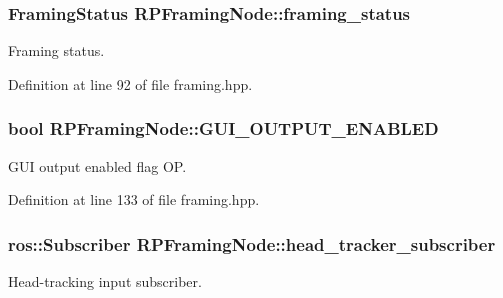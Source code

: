 \hypertarget{class_r_p_framing_node_adcfd6823bc9579a1deb6ca6640f44b93}{
\subsubsection[{framing\-\_\-status}]{\setlength{\rightskip}{0pt plus 5cm}\-Framing\-Status {\bf \-R\-P\-Framing\-Node\-::framing\-\_\-status}}}\label{class_r_p_framing_node_adcfd6823bc9579a1deb6ca6640f44b93}
\-Framing status. 

\-Definition at line 92 of file framing.\-hpp.

\hypertarget{class_r_p_framing_node_a8c5a4411117ae10fe4ff69c0fa3fb465}{
\subsubsection[{\-G\-U\-I\-\_\-\-O\-U\-T\-P\-U\-T\-\_\-\-E\-N\-A\-B\-L\-E\-D}]{\setlength{\rightskip}{0pt plus 5cm}bool {\bf \-R\-P\-Framing\-Node\-::\-G\-U\-I\-\_\-\-O\-U\-T\-P\-U\-T\-\_\-\-E\-N\-A\-B\-L\-E\-D}}}\label{class_r_p_framing_node_a8c5a4411117ae10fe4ff69c0fa3fb465}
\-G\-U\-I output enabled flag \-O\-P. 

\-Definition at line 133 of file framing.\-hpp.

\hypertarget{class_r_p_framing_node_ae1c216c2215db5cebcf18e1f7a51ae3f}{
\subsubsection[{head\-\_\-tracker\-\_\-subscriber}]{\setlength{\rightskip}{0pt plus 5cm}ros\-::\-Subscriber {\bf \-R\-P\-Framing\-Node\-::head\-\_\-tracker\-\_\-subscriber}}}\label{class_r_p_framing_node_ae1c216c2215db5cebcf18e1f7a51ae3f}
\-Head-\/tracking input subscriber. 

